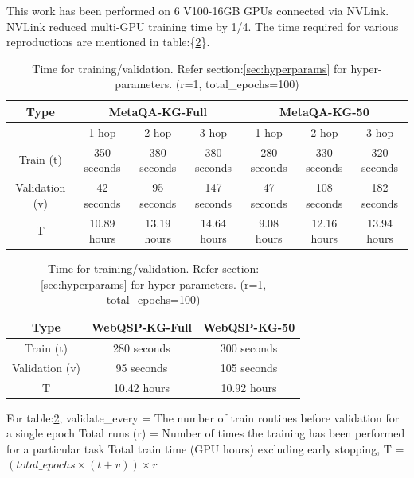 This work has been performed on 6 V100-16GB GPUs connected via NVLink. NVLink reduced multi-GPU training time by 1/4. The time required for various reproductions are mentioned in table:\{\ref{webqsp-data-train-time}\}.

\begin{table}[]
\small
\centering
\begin{tabular}{c|c|c|c|c|c|c}
\hline
\textbf{Type}  & \multicolumn{3}{c|}{\textbf{MetaQA-KG-Full}} & \multicolumn{3}{c}{\textbf{MetaQA-KG-50}} \\ \hline
               & 1-hop         & 2-hop         & 3-hop        & 1-hop        & 2-hop        & 3-hop        \\ \hline
Train (t)      & 350 seconds   & 380 seconds   & 380 seconds  & 280 seconds  & 330 seconds  & 320 seconds  \\ \hline
Validation (v) & 42 seconds    & 95 seconds    & 147 seconds  & 47 seconds   & 108 seconds  & 182 seconds  \\ \hline
T              & 10.89 hours   & 13.19 hours   & 14.64 hours  & 9.08 hours   & 12.16 hours  & 13.94 hours  \\ \hline
\end{tabular}
\vspace{.1in}
\label{metaqa-data-train-time}

\begin{tabular}{c|c|l|l|c|l|l}
\hline
\textbf{Type} & \multicolumn{3}{c|}{\textbf{WebQSP-KG-Full}} & \multicolumn{3}{c}{\textbf{WebQSP-KG-50}} \\ \hline
Train  (t)     & \multicolumn{3}{c|}{280 seconds}              & \multicolumn{3}{c}{300 seconds}            \\ \hline
Validation  (v)  & \multicolumn{3}{c|}{95 seconds}              & \multicolumn{3}{c}{105 seconds}           \\ \hline
T             & \multicolumn{3}{c|}{10.42 hours}             & \multicolumn{3}{c}{10.92 hours}           \\ \hline
\end{tabular}
\caption{Time for training/validation. Refer section:\ref{sec:hyperparams} for hyper-parameters. (r=1, total\_epochs=100)}
\label{webqsp-data-train-time}

\begin{flushleft}
For table:\ref{webqsp-data-train-time},  validate\_every = The number of train routines before validation for a single epoch \newline
Total runs (r) = Number of times the training has been performed for a particular task \newline Total train time (GPU hours) excluding early stopping, T = $(total\_epochs \times (t + v)) \times r$\newline
\end{flushleft}
\end{table}
